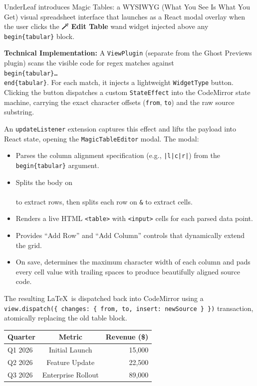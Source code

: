 \documentclass[11pt, a4paper]{article}
\begin{document}
UnderLeaf introduces Magic Tables: a WYSIWYG (What You See Is What You Get) visual spreadsheet interface that launches as a React modal overlay when the user clicks the \textbf{🪄 Edit Table} wand widget injected above any \texttt{\\begin\{tabular\}} block.

\textbf{Technical Implementation:} A \texttt{ViewPlugin} (separate from the Ghost Previews plugin) scans the visible code for regex matches against \texttt{\\begin\{tabular\}\ldots\\end\{tabular\}}. For each match, it injects a lightweight \texttt{WidgetType} button. Clicking the button dispatches a custom \texttt{StateEffect} into the CodeMirror state machine, carrying the exact character offsets (\texttt{from}, \texttt{to}) and the raw source substring.

An \texttt{updateListener} extension captures this effect and lifts the payload into React state, opening the \texttt{MagicTableEditor} modal. The modal:
\begin{itemize}[noitemsep]
    \item Parses the column alignment specification (e.g., \texttt{|l|c|r|}) from the \texttt{\\begin\{tabular\}} argument.
    \item Splits the body on \texttt{\\\\} to extract rows, then splits each row on \texttt{\&} to extract cells.
    \item Renders a live HTML \texttt{<table>} with \texttt{<input>} cells for each parsed data point.
    \item Provides ``Add Row'' and ``Add Column'' controls that dynamically extend the grid.
    \item On save, determines the maximum character width of each column and pads every cell value with trailing spaces to produce beautifully aligned source code.
\end{itemize}

The resulting \LaTeX\ is dispatched back into CodeMirror using a \texttt{view.dispatch(\{ changes: \{ from, to, insert: newSource \} \})} transaction, atomically replacing the old table block.

\vspace{1em}
\begin{center}
\begin{tabular}{|l|c|r|}
\hline
Quarter    & Metric                   & Revenue (\$) \\
\hline
Q1 2026    & Initial Launch           & 15,000       \\
Q2 2026    & Feature Update           & 22,500       \\
Q3 2026    & Enterprise Rollout       & 89,000       \\
\hline
\end{tabular}
\end{center}
\vspace{1em}
\end{document}
